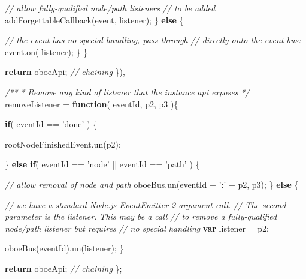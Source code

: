 \documentclass[12pt, ]{article}
\newenvironment{Shaded}{}{}
\newcommand{\KeywordTok}[1]{\textcolor[rgb]{0.00,0.44,0.13}{\textbf{{#1}}}}
\newcommand{\StringTok}[1]{\textcolor[rgb]{0.25,0.44,0.63}{{#1}}}
\newcommand{\CommentTok}[1]{\textcolor[rgb]{0.38,0.63,0.69}{\textit{{#1}}}}
\newcommand{\OtherTok}[1]{\textcolor[rgb]{0.00,0.44,0.13}{{#1}}}
\newcommand{\FunctionTok}[1]{\textcolor[rgb]{0.02,0.16,0.49}{{#1}}}
\newcommand{\NormalTok}[1]{{#1}}
\begin{document}
\begin{Shaded}
\begin{Highlighting}[]
                  \CommentTok{// allow fully-qualified node/path listeners }
                  \CommentTok{// to be added                                             }
                  \FunctionTok{addForgettableCallback}\NormalTok{(event, listener);                  }
               \NormalTok{\} }\KeywordTok{else}  \NormalTok{\{}
       
                  \CommentTok{// the event has no special handling, pass through }
                  \CommentTok{// directly onto the event bus:          }
                  \OtherTok{event}\NormalTok{.}\FunctionTok{on}\NormalTok{( listener);}
               \NormalTok{\}}
            \NormalTok{\}}
                
            \KeywordTok{return} \NormalTok{oboeApi; }\CommentTok{// chaining}
       \NormalTok{\}),}
 
       \CommentTok{/**}
\CommentTok{        * Remove any kind of listener that the instance api exposes }
\CommentTok{        */} 
       \NormalTok{removeListener = }\KeywordTok{function}\NormalTok{( eventId, p2, p3 )\{}
             
            \KeywordTok{if}\NormalTok{( eventId == }\StringTok{'done'} \NormalTok{) \{}
            
               \OtherTok{rootNodeFinishedEvent}\NormalTok{.}\FunctionTok{un}\NormalTok{(p2);}
               
            \NormalTok{\} }\KeywordTok{else} \KeywordTok{if}\NormalTok{( eventId == }\StringTok{'node'} \NormalTok{|| eventId == }\StringTok{'path'} \NormalTok{) \{}
      
               \CommentTok{// allow removal of node and path }
               \OtherTok{oboeBus}\NormalTok{.}\FunctionTok{un}\NormalTok{(eventId + }\StringTok{':'} \NormalTok{+ p2, p3);          }
            \NormalTok{\} }\KeywordTok{else} \NormalTok{\{}
      
               \CommentTok{// we have a standard Node.js EventEmitter 2-argument call.}
               \CommentTok{// The second parameter is the listener. This may be a call}
               \CommentTok{// to remove a fully-qualified node/path listener but requires}
               \CommentTok{// no special handling}
               \KeywordTok{var} \NormalTok{listener = p2;}

               \FunctionTok{oboeBus}\NormalTok{(eventId).}\FunctionTok{un}\NormalTok{(listener);                  }
            \NormalTok{\}}
               
            \KeywordTok{return} \NormalTok{oboeApi; }\CommentTok{// chaining      }
       \NormalTok{\};                               }
                        

\end{Highlighting}
\end{Shaded}
\end{document}
